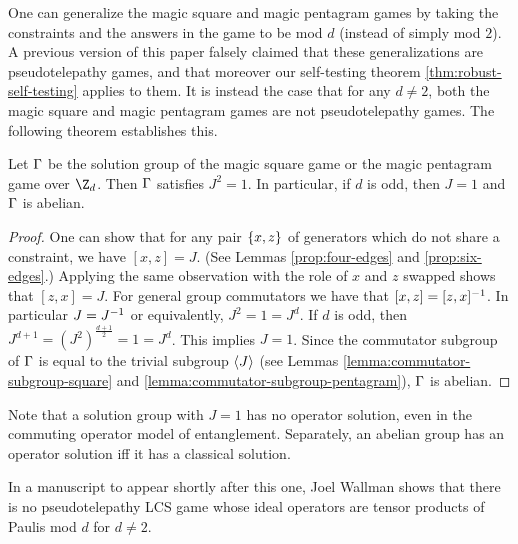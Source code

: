 One can generalize the magic square and magic pentagram games by taking the constraints and the answers in the game to be mod $d$ (instead of simply mod $2$). A previous version of this paper falsely claimed that these generalizations are pseudotelepathy games, and that moreover our self-testing theorem \ref{thm:robust-self-testing} applies to them. It is instead the case that for any $d \neq 2$, both the magic square and magic pentagram games are not pseudotelepathy games. The following theorem establishes this.

\begin{thm}
    Let $\Gamma$ be the solution group of the magic square game or the magic pentagram game over $\Z_d$. Then $\Gamma$ satisfies $J^2 = 1$. In particular, if $d$ is odd, then $J = 1$ and $\Gamma$ is abelian. 
\end{thm}

\begin{proof}
    One can show that for any pair $\left\{x,z\right\}$ of generators which do not share a constraint,
    we have $[x,z] = J$. (See Lemmas \ref{prop:four-edges} and \ref{prop:six-edges}.)
    Applying the same observation with the role of $x$ and $z$ swapped shows that $[z,x] = J.$ For general group commutators we have that $[x,z] = [z,x]^{-1}$. In particular $J = J^{-1}$ or equivalently, $J^2 = 1 = J^d$. If $d$ is odd, then $J^{d+1} = (J^2)^{\frac{d+1}{2}} = 1 = J^d$. This implies $J=1$. Since the commutator subgroup of $\Gamma$ is equal to the trivial subgroup $\braket{J}$ (see Lemmas \ref{lemma:commutator-subgroup-square} and \ref{lemma:commutator-subgroup-pentagram}), $\Gamma$ is abelian.
\end{proof}

Note that a solution group with $J=1$ has no operator solution, even in the commuting operator model of entanglement. Separately, an abelian group has an operator solution iff it has a classical solution.

In a manuscript to appear shortly after this one, Joel Wallman \cite{wallman2019} shows that there is no pseudotelepathy LCS game whose ideal operators are tensor products of Paulis mod $d$ for $d\neq 2$. 